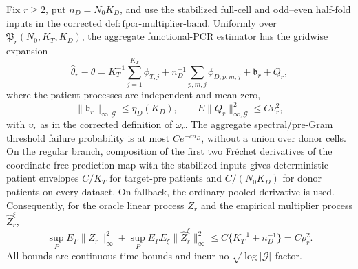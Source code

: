 Fix \(r\ge2\), put \(n_D=N_0K_D\), and use the stabilized full-cell and odd--even half-fold inputs in the corrected \(\mathrm{def:fpcr\mbox{-}multiplier\mbox{-}band}\). Uniformly over \(\mathfrak P_r(N_0,K_T,K_D)\), the aggregate functional-PCR estimator has the gridwise expansion
\[
 \widehat\theta_r-\theta
 =K_T^{-1}\sum_{j=1}^{K_T}\phi_{T,j}
 +n_D^{-1}\sum_{p,m,j}\phi_{D,p,m,j}
 +\mathfrak b_r+Q_r,
\]
where the patient processes are independent and mean zero,
\[
 \|\mathfrak b_r\|_{\infty,\mathcal G}\le\eta_D(K_D),
 \qquad E\|Q_r\|_{\infty,\mathcal G}^2\le C\upsilon_r^2,
\]
with \(\upsilon_r\) as in the corrected definition of \(\omega_r\). The aggregate spectral/pre-Gram threshold failure probability is at most \(Ce^{-cn_D}\), without a union over donor cells. On the regular branch, composition of the first two Fr\'echet derivatives of the coordinate-free prediction map with the stabilized inputs gives deterministic patient envelopes \(C/K_T\) for target-pre patients and \(C/(N_0K_D)\) for donor patients on every dataset. On fallback, the ordinary pooled derivative is used. Consequently, for the oracle linear process \(Z_r\) and the empirical multiplier process \(\widehat Z_r^\xi\),
\[
 \sup_PE_P\|Z_r\|_\infty^2
 +\sup_PE_PE_\xi\|\widehat Z_r^\xi\|_\infty^2
 \le C\{K_T^{-1}+n_D^{-1}\}=C\rho_r^2.
\]
All bounds are continuous-time bounds and incur no \(\sqrt{\log|\mathcal G|}\) factor.